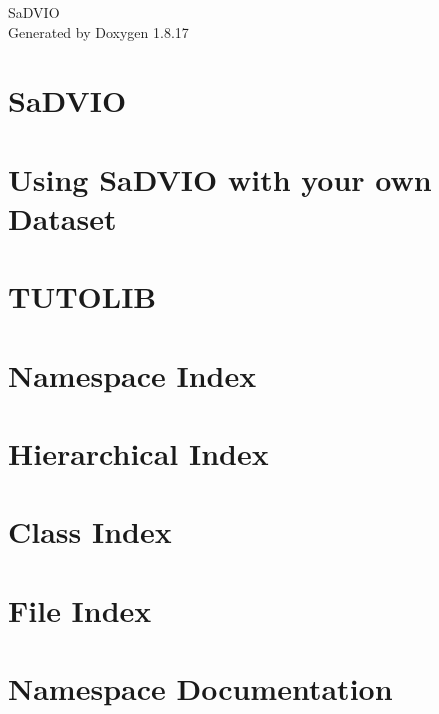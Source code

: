 \let\mypdfximage\pdfximage\def\pdfximage{\immediate\mypdfximage}\documentclass[twoside]{book}
\newcommand{\+}{\discretionary{\mbox{\scriptsize$\hookleftarrow$}}{}{}}
\newcommand{\clearemptydoublepage}{%
  \newpage{\pagestyle{empty}\cleardoublepage}%
}
\begin{document}
\hypersetup{pageanchor=false,
             bookmarksnumbered=true,
             pdfencoding=unicode
            }
\begin{titlepage}
\vspace*{7cm}
\begin{center}%
{\Large Sa\+D\+V\+IO }\\
\vspace*{1cm}
{\large Generated by Doxygen 1.8.17}\\
\end{center}
\end{titlepage}
\clearemptydoublepage
{}
\tableofcontents
\clearemptydoublepage
{}
\hypersetup{pageanchor=true}

\chapter{Sa\+D\+V\+IO}
\label{index}\hypertarget{index}{}
\chapter{Using Sa\+D\+V\+IO with your own Dataset}
\label{md__t_u_t_o}

\chapter{T\+U\+T\+O\+L\+IB}
\label{md__t_u_t_o_l_i_b}

\chapter{Namespace Index}

\chapter{Hierarchical Index}

\chapter{Class Index}

\chapter{File Index}

\chapter{Namespace Documentation}





\end{document}
